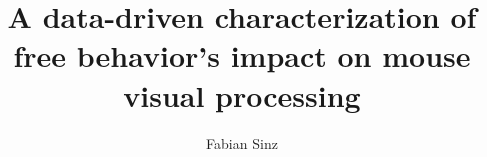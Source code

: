 \usepackage{xifthen}
\newcommand{\ifequals}[3]{\ifthenelse{\equal{#1}{#2}}{#3}{}}
\newcommand{\case}[2]{#1 #2} %
\newenvironment{switch}[1]{\renewcommand{\case}{\ifequals{#1}}}{}

\newcommand{\owptitle}[2]{
    \begin{switch}{#1}
        \case{1}{
            \begin{switch}{#2}
                \case{1}{A video-driven latent state model of the visual system}
                \case{2}{Functional twin with behavior}
            \end{switch}
        }
    \end{switch}
}


\newcommand{\oonetitle}{Develop a data-driven functional twin of mouse visual cortex and motor behavior in digitized environments}
\newcommand{\ooneshort}{Develop a data-driven functional twin}

\newcommand{\otwotitle}{Map out correspondence between neuronal tuning changes and behavioral context}
\newcommand{\otwoshort}{Neuronal tuning changes and behavioral context}

\newcommand{\othreetitle}{Predict how disabling tuning changes would affect goal-driven behavior}
\newcommand{\othreeshort}{Predict how disabling tuning changes would affect goal-driven behavior}



\author{Fabian Sinz}
\title{A data-driven characterization of free behavior's impact on mouse visual processing}
